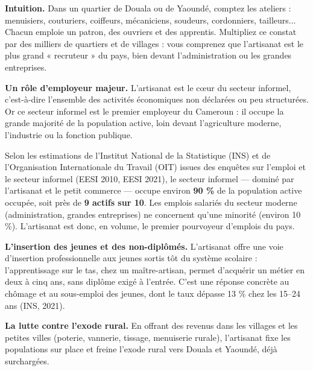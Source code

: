 \documentclass[11pt]{article}
\newcommand{\cle}[1]{{\popxbold\color{popdark}#1}}
\begin{document}
\textbf{Intuition.} Dans un quartier de Douala ou de Yaoundé, comptez les ateliers : menuisiers, couturiers, coiffeurs, mécaniciens, soudeurs, cordonniers, tailleurs... Chacun emploie un patron, des ouvriers et des apprentis. Multipliez ce constat par des milliers de quartiers et de villages : vous comprenez que l'artisanat est le plus grand « recruteur » du pays, bien devant l'administration ou les grandes entreprises.

\textbf{Un rôle d'employeur majeur.} L'artisanat est le cœur du \cle{secteur informel}, c'est-à-dire l'ensemble des activités économiques non déclarées ou peu structurées. Or ce secteur informel est le \cle{premier employeur} du Cameroun : il occupe la grande majorité de la population active, loin devant l'agriculture moderne, l'industrie ou la fonction publique.

\begin{exemplebox}
Selon les estimations de l'Institut National de la Statistique (INS) et de l'Organisation Internationale du Travail (OIT) issues des enquêtes sur l'emploi et le secteur informel (EESI 2010, EESI 2021), le secteur informel — dominé par l'artisanat et le petit commerce — occupe environ \textbf{90 \%} de la population active occupée, soit près de \textbf{9 actifs sur 10}. Les emplois salariés du secteur moderne (administration, grandes entreprises) ne concernent qu'une minorité (environ 10 \%). L'artisanat est donc, en volume, le premier pourvoyeur d'emplois du pays.
\end{exemplebox}

\textbf{L'insertion des jeunes et des non-diplômés.} L'artisanat offre une voie d'\cle{insertion professionnelle} aux jeunes sortis tôt du système scolaire : l'\cle{apprentissage} sur le tas, chez un maître-artisan, permet d'acquérir un métier en deux à cinq ans, sans diplôme exigé à l'entrée. C'est une réponse concrète au \cle{chômage} et au sous-emploi des jeunes, dont le taux dépasse 13 \% chez les 15--24 ans (INS, 2021).

\textbf{La lutte contre l'exode rural.} En offrant des revenus dans les villages et les petites villes (poterie, vannerie, tissage, menuiserie rurale), l'artisanat \cle{fixe les populations} sur place et freine l'\cle{exode rural} vers Douala et Yaoundé, déjà surchargées.
\end{document}
